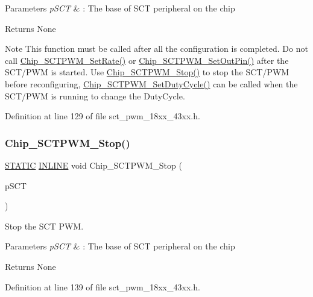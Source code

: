 \begin{DoxyParams}{Parameters}
{\em p\+S\+CT} & \+: The base of S\+CT peripheral on the chip \\
\hline
\end{DoxyParams}
\begin{DoxyReturn}{Returns}
None 
\end{DoxyReturn}
\begin{DoxyNote}{Note}
This function must be called after all the configuration is completed. Do not call \hyperlink{group___s_c_t___p_w_m__18_x_x__43_x_x_gadbcc6b9f14952ee1b2f293521918755a}{Chip\+\_\+\+S\+C\+T\+P\+W\+M\+\_\+\+Set\+Rate()} or \hyperlink{group___s_c_t___p_w_m__18_x_x__43_x_x_ga4ff891c31557e7f9b6a2ec8d8370d3c6}{Chip\+\_\+\+S\+C\+T\+P\+W\+M\+\_\+\+Set\+Out\+Pin()} after the S\+C\+T/\+P\+WM is started. Use \hyperlink{group___s_c_t___p_w_m__18_x_x__43_x_x_ga3f0637126d5ea4efa32dfdc9043b79d9}{Chip\+\_\+\+S\+C\+T\+P\+W\+M\+\_\+\+Stop()} to stop the S\+C\+T/\+P\+WM before reconfiguring, \hyperlink{group___s_c_t___p_w_m__18_x_x__43_x_x_ga3e77a40e96ba3352a341054f6d1c506c}{Chip\+\_\+\+S\+C\+T\+P\+W\+M\+\_\+\+Set\+Duty\+Cycle()} can be called when the S\+C\+T/\+P\+WM is running to change the Duty\+Cycle. 
\end{DoxyNote}


Definition at line 129 of file sct\+\_\+pwm\+\_\+18xx\+\_\+43xx.\+h.

\mbox{\label{group___s_c_t___p_w_m__18_x_x__43_x_x_ga3f0637126d5ea4efa32dfdc9043b79d9}} 
\subsubsection{\texorpdfstring{Chip\+\_\+\+S\+C\+T\+P\+W\+M\+\_\+\+Stop()}{Chip\_SCTPWM\_Stop()}}
{\footnotesize\ttfamily \hyperlink{group___l_p_c___types___public___macros_ga10b2d890d871e1489bb02b7e70d9bdfb}{S\+T\+A\+T\+IC} \hyperlink{spifi__18xx__43xx_8h_a2eb6f9e0395b47b8d5e3eeae4fe0c116}{I\+N\+L\+I\+NE} void Chip\+\_\+\+S\+C\+T\+P\+W\+M\+\_\+\+Stop (\begin{DoxyParamCaption}\item[{\hyperlink{struct_l_p_c___s_c_t___t}{L\+P\+C\+\_\+\+S\+C\+T\+\_\+T} $\ast$}]{p\+S\+CT }\end{DoxyParamCaption})}



Stop the S\+CT P\+WM. 


\begin{DoxyParams}{Parameters}
{\em p\+S\+CT} & \+: The base of S\+CT peripheral on the chip \\
\hline
\end{DoxyParams}
\begin{DoxyReturn}{Returns}
None 
\end{DoxyReturn}


Definition at line 139 of file sct\+\_\+pwm\+\_\+18xx\+\_\+43xx.\+h.

